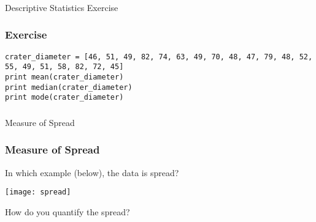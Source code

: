 

\begin{frame}[fragile]\frametitle{}
\begin{center}
{\Large Descriptive Statistics Exercise}
\end{center}
\end{frame}

\begin{frame}[fragile]\frametitle{Exercise}	
\begin{lstlisting}
crater_diameter = [46, 51, 49, 82, 74, 63, 49, 70, 48, 47, 79, 48, 52, 55, 49, 51, 58, 82, 72, 45]
print mean(crater_diameter)
print median(crater_diameter)
print mode(crater_diameter)
\end{lstlisting}

\end{frame}


\begin{frame}[fragile]\frametitle{}
\begin{center}
{\Large Measure of Spread}
\end{center}
\end{frame}

\begin{frame}[fragile]\frametitle{Measure of Spread}	

In which example (below), the data is spread?

\begin{center}
\texttt{[image: spread]}
\end{center}

How do you quantify the spread?

\end{frame}


